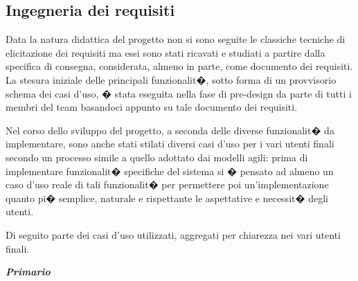 \documentclass[final, smallexted]{svjour3}
\begin{document}
\subsection{Ingegneria dei requisiti}
Data la natura didattica del progetto non si sono seguite le classiche tecniche di elicitazione dei requisiti ma essi sono stati ricavati e studiati a partire dalla specifica di consegna, considerata, almeno in parte, come documento dei requisiti. La stesura iniziale delle principali funzionalit�, sotto forma di un provvisorio schema dei casi d'uso, � stata eseguita nella fase di pre-design da parte di tutti i membri del team basandoci appunto su tale documento dei requisiti.

Nel corso dello sviluppo del progetto, a seconda delle diverse funzionalit� da implementare, sono anche stati stilati diversi casi d'uso per i vari utenti finali secondo un processo simile a quello adottato dai modelli agili: prima di implementare funzionalit� specifiche del sistema si � pensato ad almeno un caso d'uso reale di tali funzionalit� per permettere poi un'implementazione quanto pi� semplice, naturale e rispettante le aspettative e necessit� degli utenti.

Di seguito parte dei casi d'uso utilizzati, aggregati per chiarezza nei vari utenti finali.

\vspace{1cm}
\textbf{{\large \textit{Primario}}}
\vspace{.24cm}

\begin{usecase}
	
\end{usecase}
\end{document}
